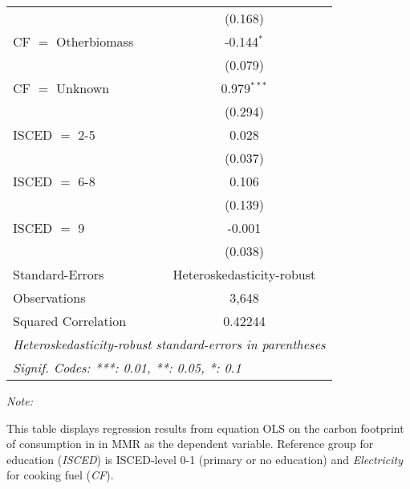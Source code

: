 \begin{table}[htbp!]
\begin{adjustbox}{width = 1\textwidth, max height = 0.95\textheight, center}
\begin{threeparttable}[b]
\begin{tabular}{lc}
                                & (0.168)\\   
            CF $=$ Otherbiomass & -0.144$^{*}$\\   
                                & (0.079)\\   
            CF $=$ Unknown      & 0.979$^{***}$\\   
                                & (0.294)\\   
            ISCED $=$ 2-5       & 0.028\\   
                                & (0.037)\\   
            ISCED $=$ 6-8       & 0.106\\   
                                & (0.139)\\   
            ISCED $=$ 9         & -0.001\\   
                                & (0.038)\\   
            \midrule 
            Standard-Errors     & Heteroskedasticity-robust \\   
            Observations        & 3,648\\  
            Squared Correlation & 0.42244\\  
            \midrule \midrule
            \multicolumn{2}{l}{\emph{Heteroskedasticity-robust standard-errors in parentheses}}\\
            \multicolumn{2}{l}{\emph{Signif. Codes: ***: 0.01, **: 0.05, *: 0.1}}\\
         \end{tabular}
         
         \begin{tablenotes}\item \medskip \textit{Note:}
            \item This table displays regression results from equation OLS on the carbon footprint of consumption in  in MMR as the dependent variable.  Reference group for education (\textit{ISCED}) is ISCED-level 0-1 (primary or no education) and \textit{Electricity} for cooking fuel (\textit{CF}).
         \end{tablenotes}
      \end{threeparttable}
   \end{adjustbox}
\end{table}



